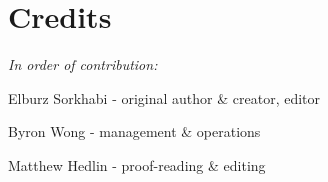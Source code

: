 \cleardoublepage
\chapter{Credits}
\label{ch:14}


\begin{fullwidth}

\textit{In order of contribution:}

Elburz Sorkhabi - original author \& creator, editor

Byron Wong - management \& operations

Matthew Hedlin - proof-reading \& editing

\end{fullwidth}


